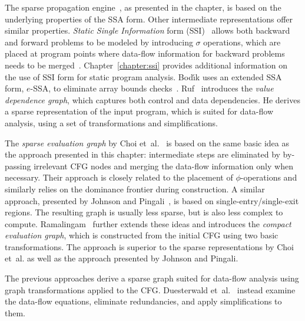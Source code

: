 The sparse propagation engine~\cite{novillo:bib:N05,bib:wegman.ea-91}, as
presented in the chapter, is based on the
underlying properties of the SSA form. Other intermediate representations offer
similar properties. \emph{Static Single Information} form
(SSI)~\cite{novillo:bib:S05} allows both backward and forward problems to be
modeled by introducing $\sigma$ operations, which are placed at program points
where data-flow information for backward problems needs to be
merged~\cite{novillo:bib:S04}. Chapter~\ref{chapter:ssi} provides additional
information on the use of SSI form for static program analysis.
Bod\'{\i}k uses an extended SSA form, $e$-SSA,
to eliminate array bounds checks~\cite{novillo:bib:BGV00}.
Ruf~\cite{novillo:bib:R95} introduces the \emph{value dependence graph}, which
captures both control and data dependencies. He derives a sparse representation
of the input program, which is suited for data-flow analysis, using a set of
transformations and simplifications.

The \emph{sparse evaluation graph} by Choi et~al.~\cite{novillo:bib:CCF91} is
based on the same basic idea as the approach presented in this chapter:
intermediate steps are eliminated by by-passing irrelevant CFG nodes and
merging the data-flow information only when necessary. Their approach is closely
related to the placement of $\phi$-operations and similarly relies on the
dominance frontier during construction. A similar approach, presented by Johnson
and Pingali~\cite{novillo:bib:JO93}, is based on single-entry/single-exit
regions. The resulting graph is usually less sparse, but is also less complex to
compute. Ramalingam~\cite{novillo:bib:R02} further extends these ideas and
introduces the \emph{compact evaluation graph}, which is constructed from the
initial CFG using two basic transformations. The approach is superior to the
sparse representations by Choi et~al. as well as the approach presented by
Johnson and Pingali.

The previous approaches derive a sparse graph suited for data-flow analysis
using graph transformations applied to the CFG.
Duesterwald et~al.~\cite{novillo:bib:DGS94} instead examine the data-flow
equations, eliminate redundancies, and apply simplifications to them.

